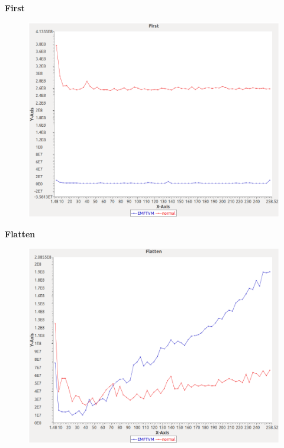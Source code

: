 \noindent\textbf{First}

\begin{figure}[h]
\centering
\includegraphics[width=\textwidth]{../graphs/orderedset/First}
\end{figure}
\pagebreak

\noindent\textbf{Flatten}

\begin{figure}[h]
\centering
\includegraphics[width=\textwidth]{../graphs/orderedset/Flatten}
\end{figure}
\pagebreak

